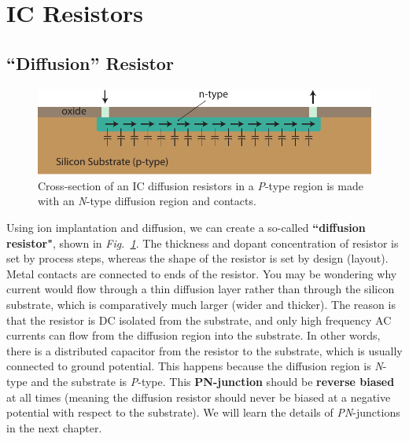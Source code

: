 \section{IC Resistors}
\subsection{“Diffusion” Resistor}
\begin{figure}[tb]
\centering
\includegraphics[width=.7\columnwidth]{diff_resistor}
\caption{Cross-section of an IC diffusion resistors in a \emph{P}-type region is made with an \emph{N}-type diffusion region and contacts.}
\label{fig:mod2-2_ICtech_sld_5}
\end{figure}
Using ion implantation and diffusion, we can create a so-called \textbf{``diffusion resistor"}, shown in \emph{Fig.~\ref{fig:mod2-2_ICtech_sld_5}}.  The thickness and dopant concentration of resistor is set by process steps, whereas the shape of the resistor is set by design (layout).   Metal contacts are connected to ends of the resistor.  You may be wondering why current would flow through a thin diffusion layer rather than through the silicon substrate, which is comparatively much larger (wider and thicker).  The reason is that the resistor is DC isolated from the substrate, and only high frequency AC currents can flow from the diffusion region into the substrate.  In other words, there is a distributed capacitor from the resistor to the substrate, which is usually connected to ground potential.  This happens because the diffusion region is \emph{N}-type and the substrate is \emph{P}-type.  This \textbf{PN-junction} should be \textbf{reverse biased} at all times (meaning the diffusion resistor should never be biased at a negative potential with respect to the substrate).  We will learn the details of \emph{PN}-junctions in the next chapter.

